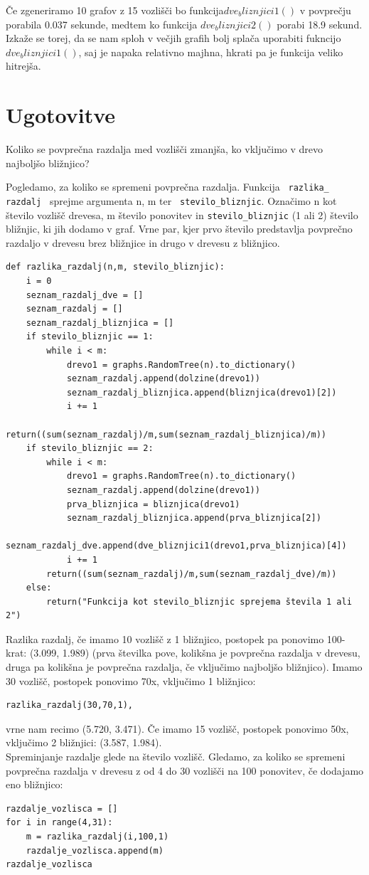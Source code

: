 \documentclass[a4paper,10pt]{article}
\begin{document}
{Če zgeneriramo 10 grafov z 15 vozlišči bo funkcija$ dve_bliznjici1()$ v povprečju porabila 0.037 sekunde, medtem ko funkcija $dve_bliznjici2()$ porabi 18.9 sekund. Izkaže se torej, da se nam sploh v večjih grafih bolj splača uporabiti fukncijo $dve_bliznjici1()$, saj je napaka relativno majhna, hkrati pa je funkcija veliko hitrejša.
\section{Ugotovitve}
 Koliko se povprečna razdalja med vozlišči zmanjša, ko vključimo v drevo najboljšo bližnjico?
\newline

Pogledamo, za koliko se spremeni povprečna razdalja. Funkcija \texttt{ razlika\_ razdalj } sprejme argumenta n, m ter \texttt{ stevilo\_bliznjic}. Označimo n kot število vozlišč drevesa, m število ponovitev in \texttt{stevilo\_bliznjic} (1 ali 2) število bližnjic, ki jih dodamo v graf. Vrne par, kjer prvo število predstavlja povprečno razdaljo v drevesu brez bližnjice in drugo v drevesu z bližnjico. 
\begin{verbatim}
def razlika_razdalj(n,m, stevilo_bliznjic):
    i = 0
    seznam_razdalj_dve = []
    seznam_razdalj = []
    seznam_razdalj_bliznjica = []
    if stevilo_bliznjic == 1:
        while i < m:
            drevo1 = graphs.RandomTree(n).to_dictionary()
            seznam_razdalj.append(dolzine(drevo1))
            seznam_razdalj_bliznjica.append(bliznjica(drevo1)[2])
            i += 1
        return((sum(seznam_razdalj)/m,sum(seznam_razdalj_bliznjica)/m))
    if stevilo_bliznjic == 2:
        while i < m:
            drevo1 = graphs.RandomTree(n).to_dictionary()
            seznam_razdalj.append(dolzine(drevo1))
            prva_bliznjica = bliznjica(drevo1)
            seznam_razdalj_bliznjica.append(prva_bliznjica[2])
            seznam_razdalj_dve.append(dve_bliznjici1(drevo1,prva_bliznjica)[4])
            i += 1
        return((sum(seznam_razdalj)/m,sum(seznam_razdalj_dve)/m))
    else:
        return("Funkcija kot stevilo_bliznjic sprejema števila 1 ali 2")
\end{verbatim}

Razlika razdalj, če imamo 10 vozlišč z 1 bližnjico, postopek pa ponovimo 100-krat:  (3.099, 1.989) (prva številka pove, kolikšna je povprečna razdalja v drevesu, druga pa kolikšna je povprečna razdalja, če vključimo najboljšo bližnjico).
\newline
Imamo 30 vozlišč, postopek ponovimo 70x, vključimo 1 bližnjico:
\begin{verbatim}
razlika_razdalj(30,70,1),
\end{verbatim}
vrne nam recimo (5.720, 3.471).
Če imamo 15 vozlišč, postopek ponovimo 50x, vključimo 2  bližnjici: (3.587, 1.984).
\\[0.5cm]
Spreminjanje razdalje glede na število vozlišč. Gledamo, za koliko se spremeni povprečna razdalja v drevesu z od 4 do 30 vozlišči na 100 ponovitev, če dodajamo eno bližnjico:
\begin{verbatim}
razdalje_vozlisca = []
for i in range(4,31):
    m = razlika_razdalj(i,100,1)
    razdalje_vozlisca.append(m)
razdalje_vozlisca
\end{verbatim}

}
\end{document}
